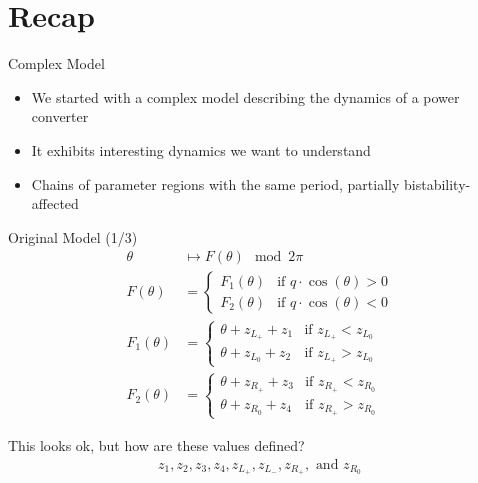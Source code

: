 \section{Recap}

\begin{frame}{Complex Model}
	\vspace{-1em}
	\begin{itemize}
		\item We started with a complex model describing the dynamics of a power converter
		\item It exhibits interesting dynamics we want to understand
		\item Chains of parameter regions with the same period, partially bistability-affected
	\end{itemize}
	\vspace{-.5em}
	\begin{figure}
	\end{figure}
\end{frame}

\begin{frame}{Original Model (1/3)}
	\vspace{-2.0em}
	\begin{align}
		\theta      & \mapsto  F(\theta) \mod 2 \pi
		\\
		F(\theta)   & = \begin{cases}
			                F_1(\theta) & \text{if } q \cdot \cos(\theta) > 0 \\
			                F_2(\theta) & \text{if } q \cdot \cos(\theta) < 0
		                \end{cases}
		\\
		F_1(\theta) & = \begin{cases}
			                \theta + z_{L_+} + z_1 & \text{if } z_{L_+} < z_{L_0} \\
			                \theta + z_{L_0} + z_2 & \text{if } z_{L_+} > z_{L_0}
		                \end{cases}
		\\
		F_2(\theta) & = \begin{cases}
			                \theta + z_{R_+} + z_3 & \text{if } z_{R_+} < z_{R_0} \\
			                \theta + z_{R_0} + z_4 & \text{if } z_{R_+} > z_{R_0}
		                \end{cases}
	\end{align}

	\pause
	\vspace{2em}
	This looks ok, but how are these values defined?
	\begin{align*}
		z_1, z_2, z_3, z_4, z_{L_+}, z_{L_-}, z_{R_+}, \text{ and } z_{R_0}
	\end{align*}
\end{frame}

